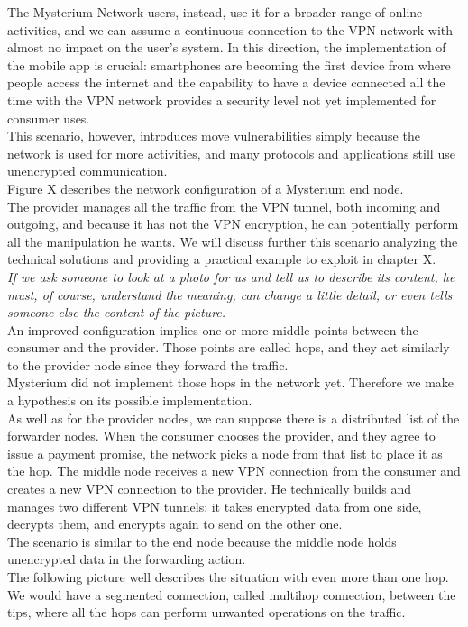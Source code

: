 \documentclass[12pt]{article}
\begin{document}
	The Mysterium Network users, instead, use it for a broader range of online activities, and we can assume a continuous connection to the VPN network with almost no impact on the user's system. In this direction, the implementation of the mobile app is crucial: smartphones are becoming the first device from where people access the internet and the capability to have a device connected all the time with the VPN network provides a security level not yet implemented for consumer uses.\\
	This scenario, however, introduces move vulnerabilities simply because the network is used for more activities, and many protocols and applications still use unencrypted communication.\\
	
	
	Figure X describes the network configuration of a Mysterium end node.\\
	The provider manages all the traffic from the VPN tunnel, both incoming and outgoing, and because it has not the VPN encryption, he can potentially perform all the manipulation he wants. We will discuss further this scenario analyzing the technical solutions and providing a practical example to exploit in chapter X.\\
	\textit{If we ask someone to look at a photo for us and tell us to describe its content, he must, of course, understand the meaning, can change a little detail, or even tells someone else the content of the picture.}\\
	An improved configuration implies one or more middle points between the consumer and the provider. Those points are called hops, and they act similarly to the provider node since they forward the traffic.\\
	Mysterium did not implement those hops in the network yet. Therefore we make a hypothesis on its possible implementation.\\
	As well as for the provider nodes, we can suppose there is a distributed list of the forwarder nodes. When the consumer chooses the provider, and they agree to issue a payment promise, the network picks a node from that list to place it as the hop. The middle node receives a new VPN connection from the consumer and creates a new VPN connection to the provider. He technically builds and manages two different VPN tunnels: it takes encrypted data from one side, decrypts them, and encrypts again to send on the other one.\\
	The scenario is similar to the end node because the middle node holds unencrypted data in the forwarding action.\\
	The following picture well describes the situation with even more than one hop. We would have a segmented connection, called multihop connection, between the tips, where all the hops can perform unwanted operations on the traffic.\\
\end{document}
